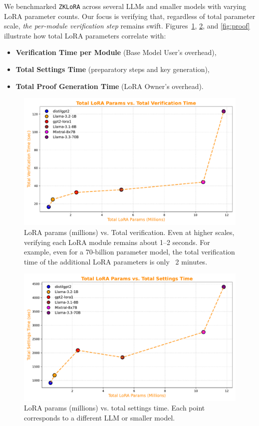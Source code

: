 \documentclass[11pt]{article}
\begin{document}
We benchmarked \texttt{ZKLoRA} across several LLMs and smaller models with varying LoRA parameter counts. Our focus is verifying that, regardless of total parameter scale, \emph{the per-module verification step} remains swift. 
Figures~\ref{fig:verify}, \ref{fig:settings}, and \ref{fig:proof} illustrate how total LoRA parameters correlate with:
\begin{itemize}
    \item \textbf{Verification Time per Module} (Base Model User’s overhead),
    \item \textbf{Total Settings Time} (preparatory steps and key generation),
    \item \textbf{Total Proof Generation Time} (LoRA Owner’s overhead).
\end{itemize}

\begin{figure}[ht]
    \centering
    \includegraphics[width=0.58\linewidth]{figs/fig_verify.pdf}
    \caption{LoRA params (millions) vs. Total verification. Even at higher scales, verifying each LoRA module remains about 1--2 seconds. For example, even for a 70-billion parameter model, the total verification time of the additional LoRA parameters is only ~2 minutes.}
    \label{fig:verify}
\end{figure}

\begin{figure}[ht]
    \centering
    \includegraphics[width=0.58\linewidth]{figs/fig_settings.pdf}
    \caption{LoRA params (millions) vs. total settings time. Each point corresponds to a different LLM or smaller model.}
    \label{fig:settings}
\end{figure}
\end{document}
